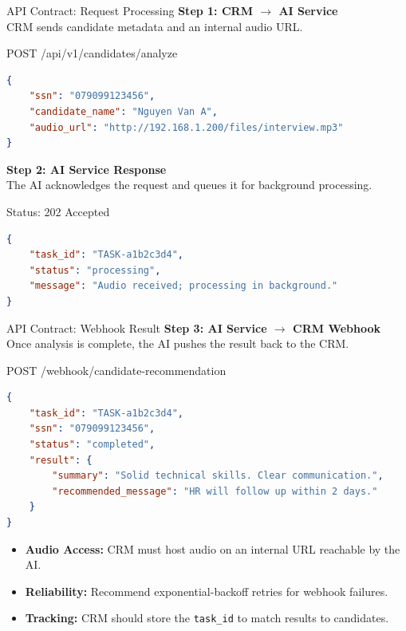 \begin{frame}[fragile]{API Contract: Request Processing}
    \textbf{Step 1: CRM $\rightarrow$ AI Service} \\
    CRM sends candidate metadata and an internal audio URL.
    
    \begin{exampleblock}{POST /api/v1/candidates/analyze}
    \begin{lstlisting}[language=json, basicstyle=\tiny]
{
    "ssn": "079099123456",
    "candidate_name": "Nguyen Van A",
    "audio_url": "http://192.168.1.200/files/interview.mp3"
}
    \end{lstlisting}
    \end{exampleblock}

    \textbf{Step 2: AI Service Response} \\
    The AI acknowledges the request and queues it for background processing.
    
    \begin{block}{Status: 202 Accepted}
    \begin{lstlisting}[language=json, basicstyle=\tiny]
{
    "task_id": "TASK-a1b2c3d4",
    "status": "processing",
    "message": "Audio received; processing in background."
}
    \end{lstlisting}
    \end{block}
\end{frame}

\begin{frame}[fragile]{API Contract: Webhook Result}
    \textbf{Step 3: AI Service $\rightarrow$ CRM Webhook} \\
    Once analysis is complete, the AI pushes the result back to the CRM.

    \begin{exampleblock}{POST /webhook/candidate-recommendation}
    \begin{lstlisting}[language=json, basicstyle=\tiny]
{
    "task_id": "TASK-a1b2c3d4",
    "ssn": "079099123456",
    "status": "completed",
    "result": {
        "summary": "Solid technical skills. Clear communication.",
        "recommended_message": "HR will follow up within 2 days."
    }
}
    \end{lstlisting}
    \end{exampleblock}

    \begin{itemize}
        \item \scriptsize \textbf{Audio Access:} CRM must host audio on an internal URL reachable by the AI.
        \item \scriptsize \textbf{Reliability:} Recommend exponential-backoff retries for webhook failures.
        \item \scriptsize \textbf{Tracking:} CRM should store the \texttt{task\_id} to match results to candidates.
    \end{itemize}
\end{frame}


